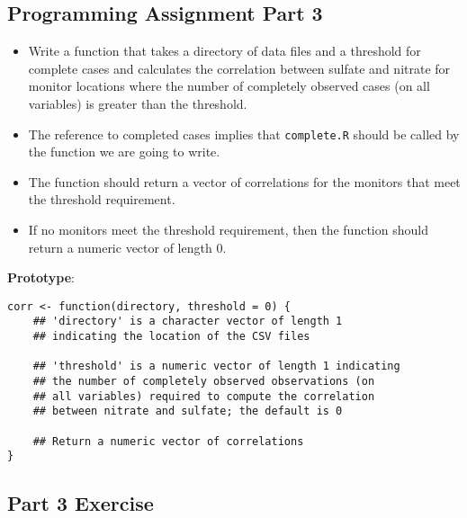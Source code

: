 \documentclass[]{article}
\begin{document}
 
\subsection{Programming Assignment Part 3 }
\begin{itemize}

\item Write a function that takes a directory of data files and a threshold for complete cases and calculates the correlation between sulfate and nitrate for monitor locations where the number of completely observed cases (on all variables) is greater than the threshold. \item The reference to completed cases implies that \texttt{complete.R} should be called by the function we are going to write. \item The function should return a vector of correlations for the monitors that meet the threshold requirement. \item If no monitors meet the threshold requirement, then the function should return a numeric vector of length 0.
\end{itemize}

\textbf{Prototype}: 
\begin{framed}
\begin{verbatim}
corr <- function(directory, threshold = 0) {
    ## 'directory' is a character vector of length 1 
    ## indicating the location of the CSV files

    ## 'threshold' is a numeric vector of length 1 indicating
    ## the number of completely observed observations (on 
    ## all variables) required to compute the correlation 
    ## between nitrate and sulfate; the default is 0

    ## Return a numeric vector of correlations
}
\end{verbatim}
\end{framed}
\newpage
\subsection{Part 3 Exercise}
\end{document}

